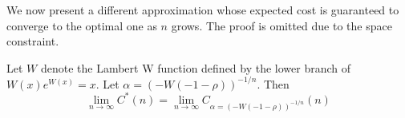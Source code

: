 
We now present a different approximation whose expected cost is guaranteed
to converge to the optimal one as $n$ grows.  The proof is omitted due to
the space constraint.

\begin{theorem}\label{theorem:approx1}
Let $W$ denote the Lambert W function defined by the lower branch of $W(x) e^{W(x)} = x$.
Let $\alpha = (-W(-1-\rho))^{-1/n}$.  Then 
$$\lim_{n \rightarrow \infty} C^*(n) = \lim_{n \rightarrow \infty} C_{\alpha = (-W(-1-\rho))^{-1/n}}(n)$$
\end{theorem}


